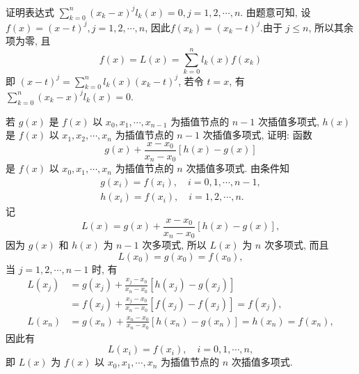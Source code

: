  \begin{tcolorbox}[enhanced,colback=10,colframe=9,breakable,coltitle=green!25!black,title=2024]
证明表达式 $ \sum\limits_{k=0}^{n}\left(x_{k}-x\right)^{j} l_{k}(x)=0, j=1,2, \cdots, n $.
\tcblower
 由题意可知, 设 $ f(x)=(x-t)^{j}, j=1,2, \cdots, n $, 因此$f\left(x_{k}\right)=\left(x_{k}-t\right)^{j}$.由于 $ j \leqslant n $, 所以其余项为零, 且
$$
f(x)=L(x)=\sum_{k=0}^{n} l_{k}(x) f\left(x_{k}\right)
$$
即 $ (x-t)^{j}=\sum\limits_{k=0}^{n} l_{k}(x)\left(x_{k}-t\right)^{j} $, 若令 $ t=x $, 有 $ \sum\limits_{k=0}^{n}\left(x_{k}-x\right)^{j} l_{k}(x)=0 $.
\end{tcolorbox}
  \begin{tcolorbox}[enhanced,colback=10,colframe=9,breakable,coltitle=green!25!black,title=2024]

若 $ g(x) $ 是 $ f(x) $ 以 $ x_{0}, x_{1}, \cdots, x_{n-1} $ 为插值节点的 $ n-1 $ 次插值多项式, $ h(x) $是 $ f(x) $ 以 $ x_{1}, x_{2}, \cdots, x_{n} $ 为插值节点的 $ n-1 $ 次插值多项式, 证明: 函数
$$
g(x)+\frac{x-x_{0}}{x_{n}-x_{0}}[h(x)-g(x)]
$$
是 $ f(x) $ 以 $ x_{0}, x_{1}, \cdots, x_{n} $ 为插值节点的 $ n $ 次插值多项式.
 \tcblower
 由条件知
$$
\begin{array}{l}
g\left(x_{i}\right)=f\left(x_{i}\right), \quad i=0,1, \cdots, n-1, \\
h\left(x_{i}\right)=f\left(x_{i}\right), \quad i=1,2, \cdots, n .
\end{array}
$$
记
$$
L(x)=g(x)+\frac{x-x_{0}}{x_{n}-x_{0}}[h(x)-g(x)],
$$
因为 $ g(x) $ 和 $ h(x) $ 为 $ n-1 $ 次多项式, 所以 $L(x) $ 为 $ n $ 次多项式, 而且
$$
L\left(x_{0}\right)=g\left(x_{0}\right)=f\left(x_{0}\right),
$$
当 $ j=1,2, \cdots, n-1 $ 时, 有
$$
\begin{aligned}
L\left(x_{j}\right)&=g\left(x_{j}\right)+\frac{x_{j}-x_{0}}{x_{n}-x_{0}}\left[h\left(x_{j}\right)-g\left(x_{j}\right)\right] \\
&=f\left(x_{j}\right)+\frac{x_{j}-x_{0}}{x_{n}-x_{0}}\left[f\left(x_{j}\right)-f\left(x_{j}\right)\right]=f\left(x_{j}\right), \\
L\left(x_{n}\right)&=g\left(x_{n}\right)+\frac{x_{n}-x_{0}}{x_{n}-x_{0}}\left[h\left(x_{n}\right)-g\left(x_{n}\right)\right]=h\left(x_{n}\right)=f\left(x_{n}\right),
\end{aligned}
$$
因此有
$$
L\left(x_{i}\right)=f\left(x_{i}\right), \quad i=0,1, \cdots, n,
$$
即 $L(x) $ 为 $ f(x) $ 以 $ x_{0}, x_{1}, \cdots, x_{n} $ 为插值节点的 $ n $ 次插值多项式.
\end{tcolorbox}

